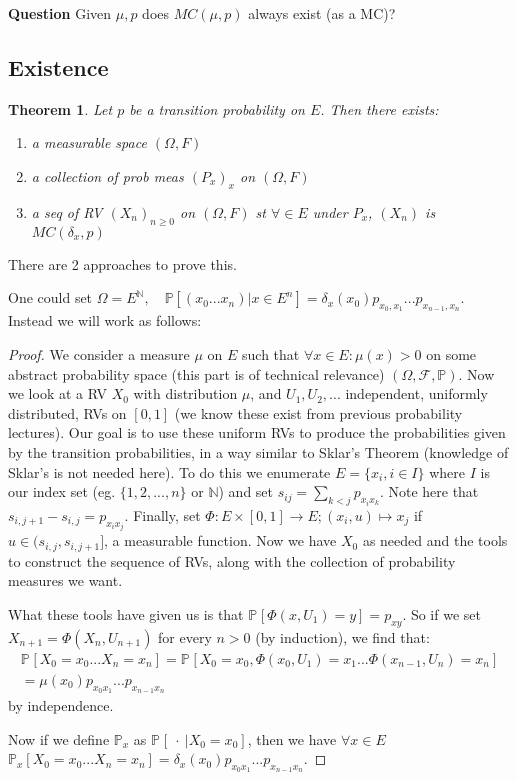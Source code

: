 \documentclass[12pt]{book}
\newtheorem{theorem}{Theorem}[section]
\theoremstyle{definition}
\theoremstyle{remark}
\begin{document}
\textbf{Question} Given $\mu, p$ does $MC(\mu, p)$ always exist (as a MC)?

\subsection{Existence}

\begin{theorem}
	Let $p$ be a transition probability on $E$. Then there exists:
\begin{enumerate}
	\item a measurable space $(\Omega, F)$
	\item a collection of prob meas $(P_x)_{x}$ on $(\Omega, F)$
	\item a seq of RV $(X_n)_{n \geq 0}$ on $(\Omega, F)$ st $\forall \in E$ under $P_x$, $(X_n)$ is  $MC(\delta_x, p)$
\end{enumerate}

\end{theorem}

There are 2 approaches to prove this. 

One could set $\Omega = E^{\mathbb{N}}, \quad \mathbb{P} \left[ (x_0...x_n) | x \in E^n \right] = \delta_x(x_0) p_{x_0,x_1}...p_{x_{n-1},x_n}$.
Instead we will work as follows:
\begin{proof}
	We consider a measure $\mu $ on $E$ such that $\forall x \in E: \mu (x) >0$ on some abstract probability space (this part is of technical relevance) $(\Omega, \mathcal{F}, \mathbb{P} )$. Now we look at a RV $X_0$ with distribution $\mu$, and $U_1,U_2,...$ independent, uniformly distributed, RVs on $[0,1]$ (we know these exist from previous probability lectures). Our goal is to use these uniform RVs to produce the probabilities given by the transition probabilities, in a way similar to Sklar's Theorem (knowledge of Sklar's is not needed here). To do this we enumerate $E=\{x_i, i \in I \}$ where $I$ is our index set (eg. $\{1,2,...,n\}$ or  $\mathbb{N}$) and set $s_{ij}= \sum_{k<j}p_{x_ix_k} $. Note here that $s_{i,j+1}-s_{i,j} = p_{x_ix_j} $. Finally, set $\Phi: E \times [0,1] \to E; (x_i,u) \mapsto x_j $ if $u \in (s_{i,j}, s_{i,j+1}]$, a measurable function. Now we have $X_0$ as needed and the tools to construct the sequence of RVs, along with the collection of probability measures we want.

	What these tools have given us is that $\mathbb{P}_{} \left[\Phi(x,U_1) = y  \right] = p_{xy}$. So if we set $X_{n+1} = \Phi(X_n, U_{n+1})$ for every $n>0$ (by induction), we find that:
\begin{gather}
	\mathbb{P}_{} \left[ X_0=x_0...X_n=x_n \right] = \mathbb{P}_{} \left[ X_0=x_0, \Phi(x_0, U_1)=x_1 ... \Phi(x_{n-1}, U_{n}) = x_n \right] \\
	= \mu(x_0)p_{x_0x_1}...p_{x_{n-1}x_n}
\end{gather}
by independence.

Now if we define $\mathbb{P}_{x} $ as $\mathbb{P}_{} \left[\ \cdot\ | X_0 = x_0 \right] $, then we have $\forall x \in E$ $\mathbb{P}_{x} \left[ X_0=x_0...X_n=x_n \right] = \delta_x(x_0)p_{x_0x_1}...p_{x_{n-1}x_n}$.


\end{proof}
\end{document}
